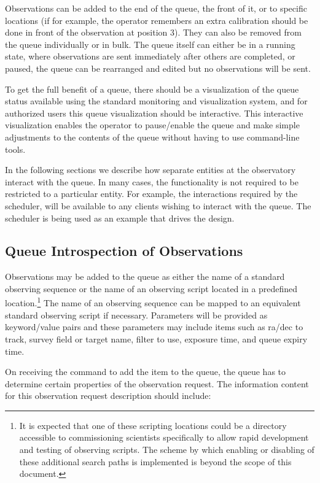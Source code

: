 \documentclass[TS,toc,lsstdraft]{lsstdoc}
\begin{document}
Observations can be added to the end of the queue, the front of it, or to specific locations (if for example, the operator remembers an extra calibration should be done in front of the observation at position 3).
They can also be removed from the queue individually or in bulk.
The queue itself can either be in a running state, where observations are sent immediately after others are completed, or paused, the queue can be rearranged and edited but no observations will be sent.

To get the full benefit of a queue, there should be a visualization of the queue status available using the standard monitoring and visualization system, and for authorized users this queue visualization should be interactive.
This interactive visualization enables the operator to pause/enable the queue and make simple adjustments to the contents of the queue without having to use command-line tools.

In the following sections we describe how separate entities at the observatory interact with the queue.
In many cases, the functionality is not required to be restricted to a particular entity.
For example, the interactions required by the scheduler, will be available to any clients wishing to interact with the queue.
The scheduler is being used as an example that drives the design.

\subsection{Queue Introspection of Observations}

Observations may be added to the queue as either the name of a standard observing sequence or the name of an observing script located in a predefined location.\footnote{It is expected that one of these scripting locations could be a directory accessible to commissioning scientists specifically to allow rapid development and testing of observing scripts. The scheme by which enabling or disabling of these additional search paths is implemented is beyond the scope of this document.}
The name of an observing sequence can be mapped to an equivalent standard observing script if necessary.
Parameters will be provided as keyword/value pairs and these parameters may include items such as ra/dec to track, survey field or target name, filter to use, exposure time, and queue expiry time.

On receiving the command to add the item to the queue, the queue has to determine certain properties of the observation request.
The information content for this observation request description should include:
\end{document}
